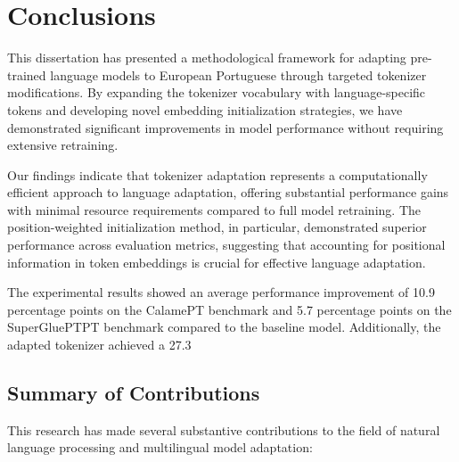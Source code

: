 
\chapter{Conclusions}


\label{chap:conclusions}

This dissertation has presented a methodological framework for adapting pre-trained language models to European Portuguese through targeted tokenizer modifications. By expanding the tokenizer vocabulary with language-specific tokens and developing novel embedding initialization strategies, we have demonstrated significant improvements in model performance without requiring extensive retraining.

Our findings indicate that tokenizer adaptation represents a computationally efficient approach to language adaptation, offering substantial performance gains with minimal resource requirements compared to full model retraining. The position-weighted initialization method, in particular, demonstrated superior performance across evaluation metrics, suggesting that accounting for positional information in token embeddings is crucial for effective language adaptation.

The experimental results showed an average performance improvement of 10.9 percentage points on the CalamePT benchmark and 5.7 percentage points on the SuperGluePTPT benchmark compared to the baseline model. Additionally, the adapted tokenizer achieved a 27.3%


\section{Summary of Contributions}
This research has made several substantive contributions to the field of natural language processing and multilingual model adaptation:

